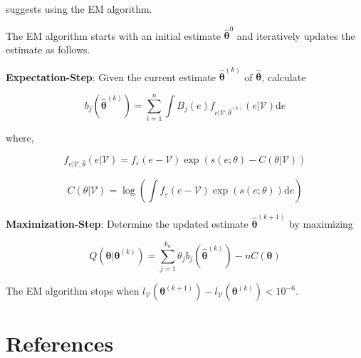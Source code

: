 \documentclass[
  12pt]{article}
\theoremstyle{definition}
\theoremstyle{remark}
\begin{document}
\citet{Kang2021} suggests using the EM algorithm.

The EM algorithm starts with an initial estimate
\(\hat{\mathbf{\theta}}^0\) and iteratively updates the estimate as
follows.

\textbf{Expectation-Step}: Given the current estimate
\(\hat{\mathbf{\theta}}^{(k)}\) of \(\hat{\mathbf{\theta}}\), calculate

\[
 b_j \left(\hat{\mathbf{\theta}}^{(k)}\right) = \sum_{i=1}^{n}\int B_j(e)f_{e|\mathcal{V},\hat{\theta}^{(k)}}(e|\mathcal{V})\text{d}e
\]

where,

\[
f_{e|\mathcal{V},\hat{\theta}}(e|\mathcal{V}) = f_{\varepsilon}(e-\mathcal{V})\exp(s(e;\theta)-C(\theta|\mathcal{V}))
\]

\[
C(\theta|\mathcal{V})=\log\left(\int f_{\varepsilon}(e-\mathcal{V})\exp(s(e;\theta))\text{d}e\right)
\]

\textbf{Maximization-Step}: Determine the updated estimate
\(\hat{\mathbf{\theta}}^{(k+1)}\) by maximizing

\[
Q(\mathbf{\theta}|\mathbf{\theta}^{(k)}) = \sum_{j=1}^{k_n}\theta_j b_j \left(\hat{\mathbf{\theta}}^{(k)}\right) - nC(\mathbf{\theta})
\]

The EM algorithm stops when
\(l_{\mathcal{V}}(\mathbf{\theta}^{(k+1)})-l_{\mathcal{V}}(\mathbf{\theta}^{(k)})<10^{-6}\).

\section*{References}\label{references}

\renewcommand{\bibsection}{}

\end{document}
